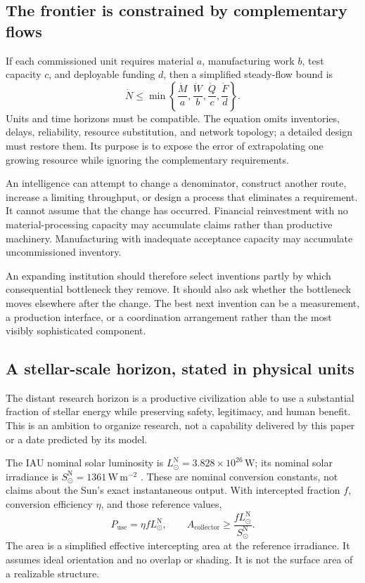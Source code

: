\subsection{The frontier is constrained by complementary flows}
If each commissioned unit requires material $a$, manufacturing work $b$, test capacity $c$, and deployable funding $d$, then a simplified steady-flow bound is
\begin{equation}
 \dot N\leq\min\left\{\frac{\dot M}{a},\frac{\dot W}{b},\frac{\dot Q}{c},\frac{\dot F}{d}\right\}.
 \label{eq:physicalcut}
\end{equation}
Units and time horizons must be compatible. The equation omits inventories, delays, reliability, resource substitution, and network topology; a detailed design must restore them. Its purpose is to expose the error of extrapolating one growing resource while ignoring the complementary requirements.

An intelligence can attempt to change a denominator, construct another route, increase a limiting throughput, or design a process that eliminates a requirement. It cannot assume that the change has occurred. Financial reinvestment with no material-processing capacity may accumulate claims rather than productive machinery. Manufacturing with inadequate acceptance capacity may accumulate uncommissioned inventory.

An expanding institution should therefore select inventions partly by which consequential bottleneck they remove. It should also ask whether the bottleneck moves elsewhere after the change. The best next invention can be a measurement, a production interface, or a coordination arrangement rather than the most visibly sophisticated component.

\subsection{A stellar-scale horizon, stated in physical units}
The distant research horizon is a productive civilization able to use a substantial fraction of stellar energy while preserving safety, legitimacy, and human benefit. This is an ambition to organize research, not a capability delivered by this paper or a date predicted by its model.

The IAU nominal solar luminosity is $L_\odot^{\mathrm N}=3.828\times10^{26}\,\mathrm W$; its nominal solar irradiance is $S_\odot^{\mathrm N}=1361\,\mathrm{W\,m^{-2}}$ \citep{iau}. These are nominal conversion constants, not claims about the Sun's exact instantaneous output. With intercepted fraction $f$, conversion efficiency $\eta$, and those reference values,
\begin{equation}
 P_{\mathrm{use}}=\eta fL_\odot^{\mathrm N},\qquad
 A_{\mathrm{collector}}\geq\frac{fL_\odot^{\mathrm N}}{S_\odot^{\mathrm N}}.
 \label{eq:stellar}
\end{equation}
The area is a simplified effective intercepting area at the reference irradiance. It assumes ideal orientation and no overlap or shading. It is not the surface area of a realizable structure.

